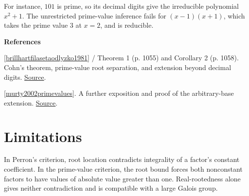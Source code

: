 \documentclass[11pt,a4paper,oneside,openany]{book}
\newenvironment{sources}{\par\smallskip\begingroup\footnotesize\color{atlasgray}\leftskip=10pt\setlength{\parskip}{2pt}}{\par\endgroup\smallskip}
\begin{document}
\color{black} For instance, \(101\) is prime, so its decimal digits give the irreducible polynomial \(x^2+1\). The unrestricted prime-value inference fails for \((x-1)(x+1)\), which takes the prime value \(3\) at \(x=2\), and is reducible.\par
\begin{sources}
\textbf{References}\par\smallskip
\noindent\hyperlink{ref:brillhartfilasetaodlyzko1981}{[brillhartfilasetaodlyzko1981]} / Theorem 1 (p. 1055) and Corollary 2 (p. 1058). Cohn's theorem, prime-value root separation, and extension beyond decimal digits. \href{https://www.cambridge.org/core/journals/canadian-journal-of-mathematics/article/on-an-irreducibility-theorem-of-a-cohn/F1644BDFD66CFC166841810C29CBA91A}{Source}.\par
\noindent\hyperlink{ref:murty2002primevalues}{[murty2002primevalues]}. A further exposition and proof of the arbitrary-base extension. \href{https://doi.org/10.1080/00029890.2002.11919872}{Source}.\par
\end{sources}\color{black}
\section{Limitations}
\color{black} In Perron's criterion, root location contradicts integrality of a factor's constant coefficient. In the prime-value criterion, the root bound forces both nonconstant factors to have values of absolute value greater than one. Real-rootedness alone gives neither contradiction and is compatible with a large Galois group.\par
\end{document}
